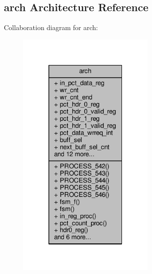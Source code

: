 \subsection{arch Architecture Reference}
\label{classp2d__wr__fsm_1_1arch}


Collaboration diagram for arch\+:\nopagebreak
\begin{figure}[H]
\begin{center}
\leavevmode
\includegraphics[width=193pt]{d7/d19/classp2d__wr__fsm_1_1arch__coll__graph}
\end{center}
\end{figure}
